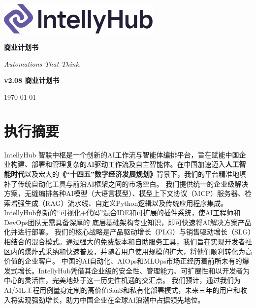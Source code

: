 \documentclass[11点, A4纸, 单面]{article}
\begin{document}
\thispagestyle{empty} 
\begin{titlepage}
    \centering
    \vspace{1cm}
    
    \includegraphics[width=0.6\textwidth]{IntellyHub_Logo_Colored.png}
    
    \vspace{2.5cm}
    
    {\Huge\bfseries\color{PrimaryColor}商业计划书}
    
    \vspace{1.5cm}
    
    {\Large\itshape\lightfont Automations That Think.}
    \vfill %
     
    {\large\bfseries\color{PrimaryColor}v2.08 \color{SecondaryColor}商业计划书}
    
    \vspace{0.5cm}
    
    {\large \today}
    
\end{titlepage}

\tableofcontents
\newpage

\section{执行摘要}
IntellyHub 智联中枢是一个创新的AI工作流与智能体编排平台，旨在赋能中国企业构建、部署和管理复杂的AI驱动工作流及自主智能体。在中国加速迈入\textbf{人工智能时代}以及宏大的\textbf{《“十四五”数字经济发展规划》}背景下，我们的平台精准地填补了传统自动化工具与前沿AI框架之间的市场空白。
我们提供统一的企业级解决方案，无缝编排各种AI模型（大语言模型）、模型上下文协议（MCP）服务器、检索增强生成（RAG）流水线、自定义Python逻辑以及传统应用程序集成。IntellyHub创新的“可视化+代码”混合IDE和可扩展的插件系统，使AI工程师和DevOps团队无需具备深厚的 底层基础架构专业知识，即可快速将AI解决方案产品化并进行部署。
我们的核心战略是产品驱动增长（PLG）与销售驱动增长（SLG）相结合的混合模式。通过强大的免费版本和自助服务工具，我们旨在实现开发者社区内的爆炸式采纳和快速普及，并随着用户使用规模的扩大，将他们顺利转化为高价值的企业客户。
中国的AI自动化、AIOps和MLOps市场正经历着前所未有的爆发式增长。IntellyHub凭借其企业级的安全性、管理能力、可扩展性和以开发者为中心的灵活性，完美地处于这一历史性机遇的交汇点。
我们预计，通过我们为AI/ML工程用例量身定制的高价值SaaS和私有化部署模式，未来三年的用户和收入将实现强劲增长，助力中国企业在全球AI浪潮中占据领先地位。
\end{document}
